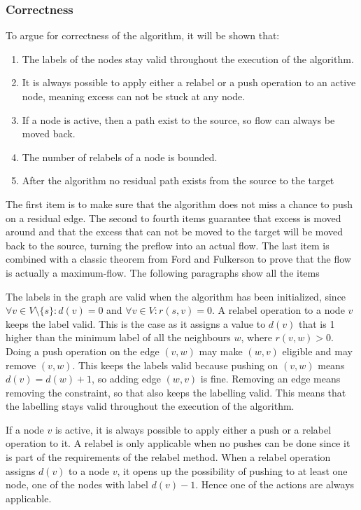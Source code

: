 \subsubsection{Correctness}
To argue for correctness of the algorithm, it will be shown that:
\begin{enumerate}
	\item The labels of the nodes stay valid throughout the execution of the algorithm.
	\item It is always possible to apply either a relabel or a push operation to an active node, meaning excess can not be stuck at any node.	
	\item If a node is active, then a path exist to the source, so flow can always be moved back.
	\item The number of relabels of a node is bounded.
	\item After the algorithm no residual path exists from the source to the target
\end{enumerate}
The first item is to make sure that the algorithm does not miss a chance to push on a residual edge.
The second to fourth items guarantee that excess is moved around and that the excess that can not be moved to the target will be moved back to the
source, turning the preflow into an actual flow.
The last item is combined with a classic theorem from Ford and Fulkerson \cite{FordFulkerson} to prove that
the flow is actually a maximum-flow. The following paragraphs show all the items

The labels in the graph are valid when the algorithm has been initialized, since $\forall v \in V \setminus \{s\}: d(v) = 0$ and
$\forall v \in V: r(s,v) = 0$. A relabel operation to a node $v$ keeps the label valid. This is the case as it assigns
a value to $d(v)$ that is 1 higher than the minimum label of all the neighbours $w$, where $r(v,w) > 0$. 
Doing a push operation on the edge $(v,w)$ may make $(w,v)$ eligible and may remove $(v,w)$.
This keeps the labels valid because pushing on $(v,w)$ means $d(v) = d(w)+1$, so adding edge $(w,v)$ is fine. 
Removing an edge means removing the constraint, so that also keeps the labelling valid. This
means that the labelling stays valid throughout the execution of the algorithm.

If a node $v$ is active, it is always possible to apply either a push or a relabel operation to it.
A relabel is only applicable when no pushes can be done since it is part of the requirements of the relabel method.
When a relabel operation assigns $d(v)$ to a node $v$, it opens up the possibility of pushing to at least
one node, one of the nodes with label $d(v)-1$. Hence one of the actions are always applicable.

